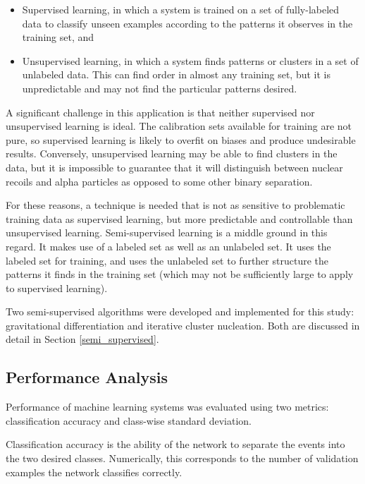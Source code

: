 \documentclass[10pt]{article}
\begin{document}
\begin{itemize}
    \item Supervised learning, in which a system is trained on a set of fully-labeled data to classify unseen examples according to the patterns it observes in the training set, and
    \item Unsupervised learning, in which a system finds patterns or clusters in a set of unlabeled data. This can find order in almost any training set, but it is unpredictable and may not find the particular patterns desired.
\end{itemize}

A significant challenge in this application is that neither supervised nor unsupervised learning is ideal. The calibration sets available for training are not pure, so supervised learning is likely to overfit on biases and produce undesirable results. Conversely, unsupervised learning may be able to find clusters in the data, but it is impossible to guarantee that it will distinguish between nuclear recoils and alpha particles as opposed to some other binary separation.

For these reasons, a technique is needed that is not as sensitive to problematic training data as supervised learning, but more predictable and controllable than unsupervised learning. Semi-supervised learning is a middle ground in this regard. It makes use of a labeled set as well as an unlabeled set. It uses the labeled set for training, and uses the unlabeled set to further structure the patterns it finds in the training set (which may not be sufficiently large to apply to supervised learning).

Two semi-supervised algorithms were developed and implemented for this study: gravitational differentiation and iterative cluster nucleation. Both are discussed in detail in Section \ref{semi_supervised}.

\subsection{Performance Analysis}

Performance of machine learning systems was evaluated using two metrics: classification accuracy and class-wise standard deviation.

Classification accuracy is the ability of the network to separate the events into the two desired classes. Numerically, this corresponds to the number of validation examples the network classifies correctly.
\end{document}
